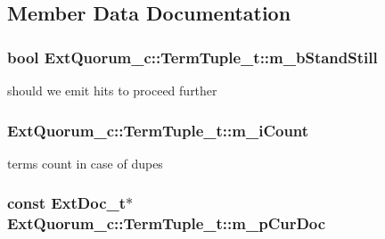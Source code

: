 \subsection{Member Data Documentation}
\hypertarget{structExtQuorum__c_1_1TermTuple__t_a446e5834964ab6352810922723c4f5ba}{
\subsubsection[{m\-\_\-b\-Stand\-Still}]{\setlength{\rightskip}{0pt plus 5cm}bool Ext\-Quorum\-\_\-c\-::\-Term\-Tuple\-\_\-t\-::m\-\_\-b\-Stand\-Still}}\label{structExtQuorum__c_1_1TermTuple__t_a446e5834964ab6352810922723c4f5ba}


should we emit hits to proceed further 

\hypertarget{structExtQuorum__c_1_1TermTuple__t_a001ab978f610448e994acc30beeb2587}{
\subsubsection[{m\-\_\-i\-Count}]{ Ext\-Quorum\-\_\-c\-::\-Term\-Tuple\-\_\-t\-::m\-\_\-i\-Count}}\label{structExtQuorum__c_1_1TermTuple__t_a001ab978f610448e994acc30beeb2587}


terms count in case of dupes 

\hypertarget{structExtQuorum__c_1_1TermTuple__t_abaee7cb9e84136853b2800aafe1bcf16}{
\subsubsection[{m\-\_\-p\-Cur\-Doc}]{\setlength{\rightskip}{0pt plus 5cm}const {\bf Ext\-Doc\-\_\-t}$\ast$ Ext\-Quorum\-\_\-c\-::\-Term\-Tuple\-\_\-t\-::m\-\_\-p\-Cur\-Doc}}\label{structExtQuorum__c_1_1TermTuple__t_abaee7cb9e84136853b2800aafe1bcf16}


